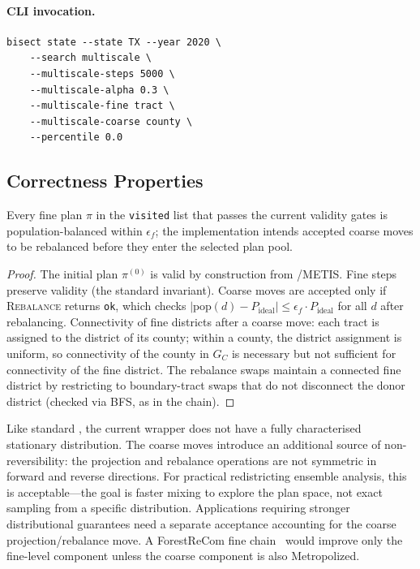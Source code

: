 \paragraph{CLI invocation.}
\begin{verbatim}
bisect state --state TX --year 2020 \
    --search multiscale \
    --multiscale-steps 5000 \
    --multiscale-alpha 0.3 \
    --multiscale-fine tract \
    --multiscale-coarse county \
    --percentile 0.0
\end{verbatim}

\subsection{Correctness Properties}

\begin{proposition}[Fine plan validity]
\label{prop:validity}
Every fine plan $\pi$ in the \texttt{visited} list that passes the current
validity gates is population-balanced within $\epsilon_f$; the implementation
intends accepted coarse moves to be rebalanced before they enter the selected
plan pool.
\end{proposition}

\begin{proof}
The initial plan $\pi^{(0)}$ is valid by construction from \cs{}/METIS.
Fine \recom{} steps preserve validity (the standard \recom{} invariant).
Coarse moves are accepted only if \textsc{Rebalance} returns \texttt{ok},
which checks $|\mathrm{pop}(d) - P_{\mathrm{ideal}}| \leq \epsilon_f \cdot
P_{\mathrm{ideal}}$ for all $d$ after rebalancing.
Connectivity of fine districts after a coarse move: each tract is assigned
to the district of its county; within a county, the district assignment is
uniform, so connectivity of the county in $G_C$ is necessary but not
sufficient for connectivity of the fine district.
The rebalance swaps maintain a connected fine district by restricting to
boundary-tract swaps that do not disconnect the donor district (checked via
BFS, as in the \flip{} chain).
\end{proof}

\begin{remark}[Stationarity]
\label{rem:stationarity}
Like standard \recom{}, the current \ms{} wrapper does not have a fully characterised stationary
distribution.
The coarse moves introduce an additional source of non-reversibility: the
projection and rebalance operations are not symmetric in forward and reverse
directions.
For practical redistricting ensemble analysis, this is acceptable---the goal
is faster mixing to explore the plan space, not exact sampling from a specific
distribution.
Applications requiring stronger distributional guarantees need a separate
acceptance accounting for the coarse projection/rebalance move. A ForestReCom
fine chain~\citep{dellaLibera2026forestRecom} would improve only the fine-level
component unless the coarse component is also Metropolized.
\end{remark}
